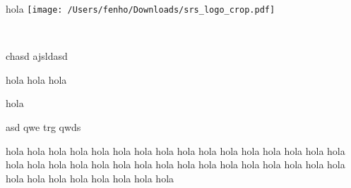 \documentclass[]{srs}
\begin{document}
hola
\texttt{[image: /Users/fenho/Downloads/srs\_logo\_crop.pdf]}
\newpage

%
{\footnotesize{\colegio\\{\asignatura}\ifthenelse{\isundefined{\curso}}{}{{ -} {\curso}} }}



chasd ajsldasd

\begin{preguntas}
\pregunta hola
\pregunta hola
\pregunta hola
\begin{malla}[height=3cm]
\end{malla}
\begin{respuesta}[height=2cm]
\end{respuesta}
\pregunta hola

\begin{vertical}
  \alternativa asd
  \alternativa qwe
  \alternativa trg
  \alternativa qwds
\end{vertical}
\pregunta hola
\pregunta hola
\pregunta hola
\pregunta hola
\pregunta hola
\pregunta hola
\pregunta hola
\pregunta hola
\pregunta hola
\pregunta hola
\pregunta hola
\pregunta hola
\pregunta hola
\pregunta hola
\pregunta hola
\pregunta hola
\pregunta hola
\pregunta hola
\pregunta hola
\pregunta hola
\pregunta hola
\pregunta hola
\pregunta hola
\pregunta hola
\pregunta hola
\pregunta hola
\pregunta hola
\pregunta hola
\pregunta hola
\pregunta hola
\pregunta hola
\pregunta hola
\pregunta hola
\pregunta hola
\pregunta hola
\pregunta hola
\pregunta hola
\pregunta hola
\pregunta hola
\pregunta hola
\end{preguntas}
\end{document}
